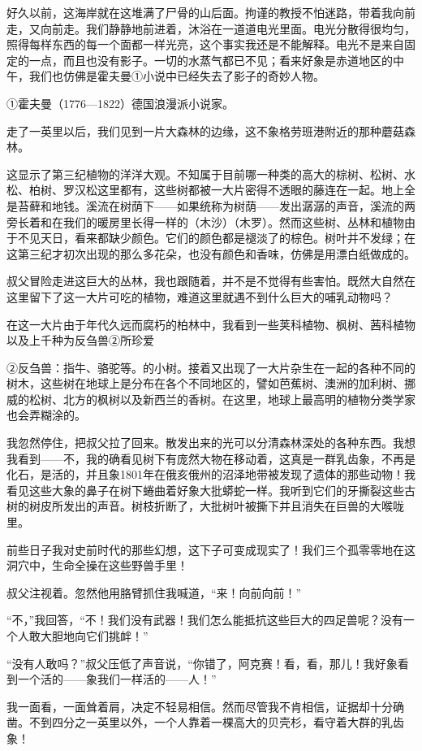 \documentclass[10pt]{book}
\begin{document}
好久以前，这海岸就在这堆满了尸骨的山后面。拘谨的教授不怕迷路，带着我向前走，又向前走。我们静静地前进着，沐浴在一道道电光里面。电光分散得很均匀，照得每样东西的每一个面都一样光亮，这个事实我还是不能解释。电光不是来自固定的一点，而且也没有影子。一切的水蒸气都已不见；看来好象是赤道地区的中午，我们也仿佛是霍夫曼①小说中已经失去了影子的奇妙人物。

①霍夫曼（1776—1822）德国浪漫派小说家。

走了一英里以后，我们见到一片大森林的边缘，这不象格劳班港附近的那种蘑菇森林。

这显示了第三纪植物的洋洋大观。不知属于目前哪一种类的高大的棕树、松树、水松、柏树、罗汉松这里都有，这些树都被一大片密得不透眼的藤连在一起。地上全是苔藓和地钱。溪流在树荫下——如果统称为树荫——发出潺潺的声音，溪流的两旁长着和在我们的暖房里长得一样的（木沙）（木罗）。然而这些树、丛林和植物由于不见天日，看来都缺少颜色。它们的颜色都是褪淡了的棕色。树叶并不发绿；在这第三纪才初次出现的那么多花朵，也没有颜色和香味，仿佛是用漂白纸做成的。

叔父冒险走进这巨大的丛林，我也跟随着，并不是不觉得有些害怕。既然大自然在这里留下了这一大片可吃的植物，难道这里就遇不到什么巨大的哺乳动物吗？

在这一大片由于年代久远而腐朽的柏林中，我看到一些荚科植物、枫树、茜科植物以及上千种为反刍兽②所珍爱

②反刍兽：指牛、骆驼等。的小树。接着又出现了一大片杂生在一起的各种不同的树木，这些树在地球上是分布在各个不同地区的，譬如芭蕉树、澳洲的加利树、挪威的松树、北方的枫树以及新西兰的香树。在这里，地球上最高明的植物分类学家也会弄糊涂的。

我忽然停住，把叔父拉了回来。散发出来的光可以分清森林深处的各种东西。我想我看到——不，我的确看见树下有庞然大物在移动着，这真是一群乳齿象，不再是化石，是活的，并且象1801年在俄亥俄州的沼泽地带被发现了遗体的那些动物！我看见这些大象的鼻子在树下蜷曲着好象大批蟒蛇一样。我听到它们的牙撕裂这些古树的树皮所发出的声音。树枝折断了，大批树叶被撕下并且消失在巨兽的大喉咙里。

前些日子我对史前时代的那些幻想，这下子可变成现实了！我们三个孤零零地在这洞穴中，生命全操在这些野兽手里！

叔父注视着。忽然他用胳臂抓住我喊道，“来！向前向前！”

“不，”我回答，“不！我们没有武器！我们怎么能抵抗这些巨大的四足兽呢？没有一个人敢大胆地向它们挑衅！”

“没有人敢吗？”叔父压低了声音说，“你错了，阿克赛！看，看，那儿！我好象看到一个活的——象我们一样活的——人！”

我一面看，一面耸着肩，决定不轻易相信。然而尽管我不肯相信，证据却十分确凿。不到四分之一英里以外，一个人靠着一棵高大的贝壳杉，看守着大群的乳齿象！
\end{document}
